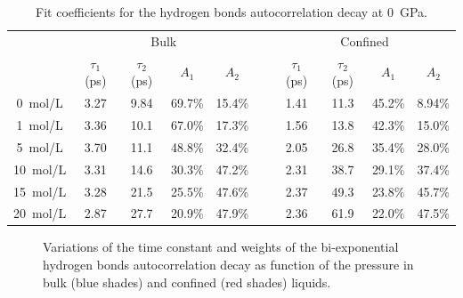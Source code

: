 \documentclass[thesis]{subfiles}
\begin{document}
\begin{table}[b]
    \caption{Fit coefficients for the hydrogen bonds autocorrelation decay at \SI{0}{GPa}.}
    \label{table:licl-zif:hbonds}
    \centering
    \begin{tabular}{c c c c c c c c c c}
        \toprule
        \multicolumn{1}{c}{~} & \multicolumn{4}{c}{Bulk}                          &~& \multicolumn{4}{c}{Confined} \\
        \multicolumn{1}{c}{~} & $\tau_1$ (ps) & $\tau_2$ (ps) & $A_1$   & $A_2$   &~& $\tau_1$ (ps) & $\tau_2$ (ps) & $A_1$   & $A_2$   \\
        \midrule
        \SI{0}{mol/L}         &    3.27       &    9.84       & 69.7\% & 15.4\% &~&  1.41         &  11.3         & 45.2\% & 8.94\% \\
        \SI{1}{mol/L}         &    3.36       &    10.1       & 67.0\% & 17.3\% &~&  1.56         &  13.8         & 42.3\% & 15.0\% \\
        \SI{5}{mol/L}         &    3.70       &    11.1       & 48.8\% & 32.4\% &~&  2.05         &  26.8         & 35.4\% & 28.0\% \\
        \SI{10}{mol/L}        &    3.31       &    14.6       & 30.3\% & 47.2\% &~&  2.31         &  38.7         & 29.1\% & 37.4\% \\
        \SI{15}{mol/L}        &    3.28       &    21.5       & 25.5\% & 47.6\% &~&  2.37         &  49.3         & 23.8\% & 45.7\% \\
        \SI{20}{mol/L}        &    2.87       &    27.7       & 20.9\% & 47.9\% &~&  2.36         &  61.9         & 22.0\% & 47.5\% \\
        \bottomrule
    \end{tabular}
\end{table}

\begin{figure}[ht]
    \centering
    
    \caption{Variations of the time constant and weights of the bi-exponential
    hydrogen bonds autocorrelation decay as function of the pressure in bulk
    (blue shades) and confined (red shades) liquids.}
    \label{fig:licl-zif:hbonds:fit:pressure}
\end{figure}

%     
\end{document}
